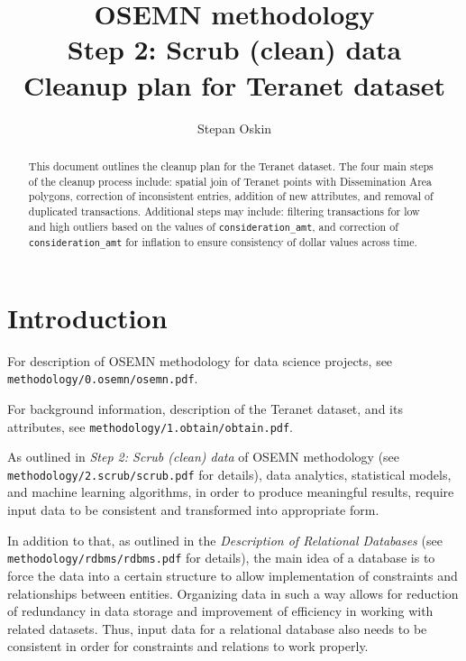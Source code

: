 \documentclass[11pt]{article}
\begin{document}
    \title{OSEMN methodology \\
    Step 2: Scrub (clean) data \\
    Cleanup plan for Teranet dataset}

    \author{Stepan Oskin}

    \maketitle

    \begin{abstract}
        This document outlines the cleanup plan for the Teranet dataset.
        The four main steps of the cleanup process include: spatial join of Teranet points with Dissemination Area polygons, correction of inconsistent entries, addition of new attributes, and removal of duplicated transactions.
        Additional steps may include: filtering transactions for low and high outliers based on the values of \texttt{consideration\_amt}, and correction of \texttt{consideration\_amt} for inflation to ensure consistency of dollar values across time.
    \end{abstract}

    \section{Introduction} \label{sec:teranet_cleaning_intro}

    For description of OSEMN methodology for data science projects, see \\ \texttt{methodology/0.osemn/osemn.pdf}.

    \vspace{5mm}

    For background information, description of the Teranet dataset, and its attributes, see \texttt{methodology/1.obtain/obtain.pdf}.

    \vspace{5mm}

    As outlined in \textit{Step 2: Scrub (clean) data} of OSEMN methodology (see \texttt{methodology/2.scrub/scrub.pdf} for details), data analytics, statistical models, and machine learning algorithms, in order to produce meaningful results, require input data to be consistent and transformed into appropriate form.

    In addition to that, as outlined in the \textit{Description of Relational Databases} (see \texttt{methodology/rdbms/rdbms.pdf} for details), the main idea of a database is to force the data into a certain structure to allow implementation of constraints and relationships between entities.
    Organizing data in such a way allows for reduction of redundancy in data storage and improvement of efficiency in working with related datasets.
    Thus, input data for a relational database also needs to be consistent in order for constraints and relations to work properly.
\end{document}
